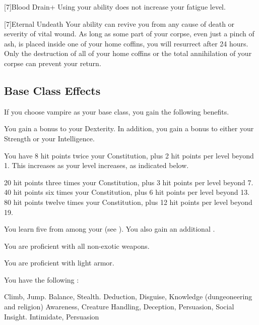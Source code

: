       [7]{Blood Drain+} Using your  ability does not increase your fatigue level.

      [7]{Eternal Undeath} Your  ability can revive you from any cause of death or severity of vital wound.
      As long as some part of your corpse, even just a pinch of ash, is placed inside one of your home coffins, you will resurrect after 24 hours.
      Only the destruction of all of your home coffins or the total annihilation of your corpse can prevent your return.

  \subsection{Base Class Effects}
    If you choose vampire as your base class, you gain the following benefits.

      You gain a  bonus to your Dexterity. In addition, you gain a  bonus to either your Strength or your Intelligence.

      You have 8 hit points \add twice your Constitution, plus 2 hit points per level beyond 1.
      This increases as your level increases, as indicated below.
      \begin{itemize}
         20 hit points \add three times your Constitution, plus 3 hit points per level beyond 7.
         40 hit points \add six times your Constitution, plus 6 hit points per level beyond 13.
         80 hit points \add twelve times your Constitution, plus 12 hit points per level beyond 19.
      \end{itemize}

      You learn five  from among your  (see ).
      You also gain an additional .

      You are proficient with all non-exotic weapons.

      You are proficient with light armor.

      You have the following :
      \begin{itemize}
         Climb, Jump.
         Balance, Stealth.
         Deduction, Disguise, Knowledge (dungeoneering and religion)
         Awareness, Creature Handling, Deception, Persuasion, Social Insight.
         Intimidate, Persuasion
      \end{itemize}
